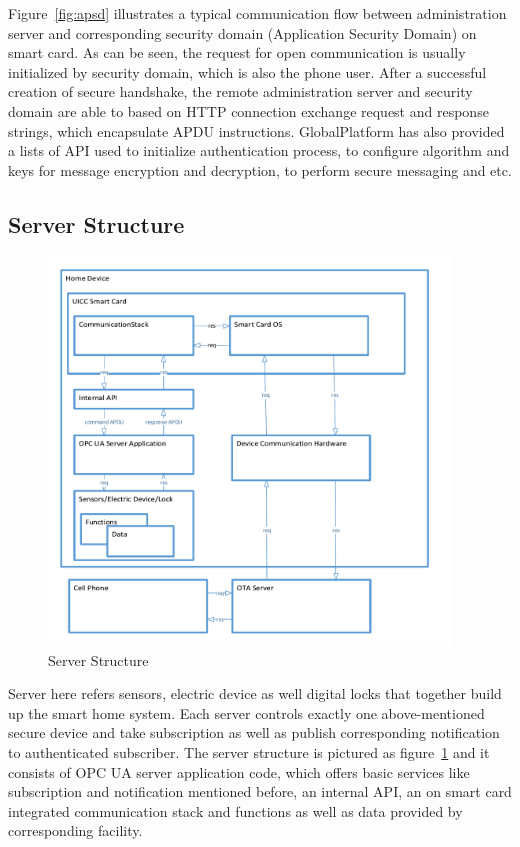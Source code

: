 Figure~\ref{fig:apsd} illustrates a typical communication flow between administration server and corresponding security domain (Application Security Domain) on smart card. As can be seen, the request for open communication is usually initialized by security domain, which is also the phone user. After a successful creation of secure handshake, the remote administration server and security domain are able to based on HTTP connection exchange request and response strings, which encapsulate APDU instructions. GlobalPlatform has also provided  a lists of API used to initialize authentication process, to configure algorithm and keys for message encryption and decryption, to perform secure messaging and etc.

\subsection{Server Structure}

\begin{figure}
	\centering
	\includegraphics[width=0.95\textwidth]{serverStructure}
		\caption{Server Structure}
	\label{fig:serverStructure}
\end{figure}
Server here refers sensors, electric device as well digital locks that together build up the smart home system. Each server controls exactly one above-mentioned secure device and take subscription as well as publish corresponding notification to authenticated subscriber. The server structure is pictured as figure~\ref{fig:serverStructure} and it consists of OPC UA server application code, which offers basic services like subscription and notification mentioned before, an internal API, an on smart card integrated communication stack and functions as well as data provided by corresponding facility.

